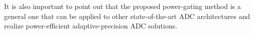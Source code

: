 It is also important to point out that the proposed power-gating method is a general one 
that can be applied to other state-of-the-art ADC architectures and realize power-efficient 
adaptive-precision ADC solutions. 



